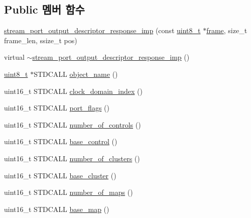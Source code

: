 \subsection*{Public 멤버 함수}
\begin{DoxyCompactItemize}
\item 
\hyperlink{classavdecc__lib_1_1stream__port__output__descriptor__response__imp_a2e2ce369bf7f75df6eee0d7841a30d9c}{stream\+\_\+port\+\_\+output\+\_\+descriptor\+\_\+response\+\_\+imp} (const \hyperlink{stdint_8h_aba7bc1797add20fe3efdf37ced1182c5}{uint8\+\_\+t} $\ast$\hyperlink{gst__avb__playbin_8c_ac8e710e0b5e994c0545d75d69868c6f0}{frame}, size\+\_\+t frame\+\_\+len, ssize\+\_\+t pos)
\item 
virtual \hyperlink{classavdecc__lib_1_1stream__port__output__descriptor__response__imp_a0445894808fb93c5be312aedaf630339}{$\sim$stream\+\_\+port\+\_\+output\+\_\+descriptor\+\_\+response\+\_\+imp} ()
\item 
\hyperlink{stdint_8h_aba7bc1797add20fe3efdf37ced1182c5}{uint8\+\_\+t} $\ast$S\+T\+D\+C\+A\+LL \hyperlink{classavdecc__lib_1_1stream__port__output__descriptor__response__imp_a15837e3eb254ad44812cb766ae8cd53c}{object\+\_\+name} ()
\item 
uint16\+\_\+t S\+T\+D\+C\+A\+LL \hyperlink{classavdecc__lib_1_1stream__port__output__descriptor__response__imp_a25f4f17a510b3f05e97806cd40751774}{clock\+\_\+domain\+\_\+index} ()
\item 
uint16\+\_\+t S\+T\+D\+C\+A\+LL \hyperlink{classavdecc__lib_1_1stream__port__output__descriptor__response__imp_ae5cbe71db539f040ce51a399c2ba66c5}{port\+\_\+flags} ()
\item 
uint16\+\_\+t S\+T\+D\+C\+A\+LL \hyperlink{classavdecc__lib_1_1stream__port__output__descriptor__response__imp_abdf54b1d2b03f5f2b7346ddc9d93df5c}{number\+\_\+of\+\_\+controls} ()
\item 
uint16\+\_\+t S\+T\+D\+C\+A\+LL \hyperlink{classavdecc__lib_1_1stream__port__output__descriptor__response__imp_a81a06cae8ad2431f6a3e067cc210aa98}{base\+\_\+control} ()
\item 
uint16\+\_\+t S\+T\+D\+C\+A\+LL \hyperlink{classavdecc__lib_1_1stream__port__output__descriptor__response__imp_a3d7106b0835bc6a75c4ff27011c9666e}{number\+\_\+of\+\_\+clusters} ()
\item 
uint16\+\_\+t S\+T\+D\+C\+A\+LL \hyperlink{classavdecc__lib_1_1stream__port__output__descriptor__response__imp_a03b85cb427681a1de77dbfacda75f39a}{base\+\_\+cluster} ()
\item 
uint16\+\_\+t S\+T\+D\+C\+A\+LL \hyperlink{classavdecc__lib_1_1stream__port__output__descriptor__response__imp_a05d30e1a63b1459efaacfc203df1c9d7}{number\+\_\+of\+\_\+maps} ()
\item 
uint16\+\_\+t S\+T\+D\+C\+A\+LL \hyperlink{classavdecc__lib_1_1stream__port__output__descriptor__response__imp_abd6f9fab6c33d076df43b45ccd40d589}{base\+\_\+map} ()
\end{DoxyCompactItemize}
